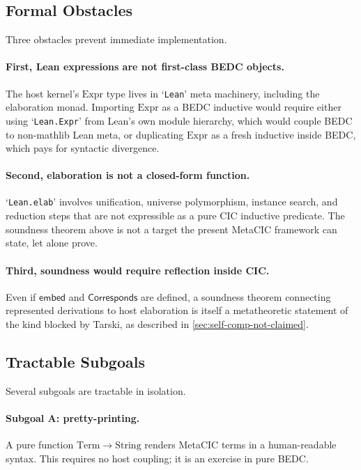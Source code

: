 \subsection{Formal Obstacles}\label{subsec:bridge-obstacles}

Three obstacles prevent immediate implementation.

\paragraph{First, Lean expressions are not first-class BEDC objects.} The host
kernel's $\mathrm{Expr}$ type lives in `\verb|Lean|' meta machinery, including
the elaboration monad. Importing $\mathrm{Expr}$ as a BEDC inductive would
require either using `\verb|Lean.Expr|' from Lean's own module hierarchy, which
would couple BEDC to non-mathlib Lean meta, or duplicating $\mathrm{Expr}$ as a
fresh inductive inside BEDC, which pays for syntactic divergence.

\paragraph{Second, elaboration is not a closed-form function.}
`\verb|Lean.elab|' involves unification, universe polymorphism, instance
search, and reduction steps that are not expressible as a pure CIC inductive
predicate. The soundness theorem above is not a target the present MetaCIC
framework can state, let alone prove.

\paragraph{Third, soundness would require reflection inside CIC.} Even if
$\mathsf{embed}$ and $\mathsf{Corresponds}$ are defined, a soundness theorem
connecting represented derivations to host elaboration is itself a
metatheoretic statement of the kind blocked by Tarski, as described in
\autoref{sec:self-comp-not-claimed}.

\subsection{Tractable Subgoals}\label{subsec:bridge-subgoals}

Several subgoals are tractable in isolation.

\paragraph{Subgoal A: pretty-printing.} A pure function
$\mathrm{Term} \to \mathrm{String}$ renders MetaCIC terms in a human-readable
syntax. This requires no host coupling; it is an exercise in pure BEDC.

